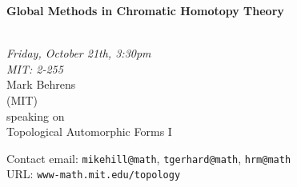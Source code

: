 \documentclass{slides}
\begin{document}
\begin{center}

{\fontsize {54pt}{40pt}\selectfont

\textrm{
{\textbf{Global Methods in Chromatic Homotopy Theory}}}
}\\
\vspace{1cm}
{\large\textrm{\emph{Friday, October 21th, 3:30pm\\MIT: 2-255}}}\\
\vspace{1cm}
\textrm{{\LARGE Mark Behrens  \\[.5cm](MIT)}}\\
\vspace{1cm} %
\textrm{speaking on}\\ %
\vspace{5mm}
\textrm{{\LARGE Topological Automorphic Forms I}}\\
\end{center}
\vspace{1cm}
{\small

\textrm{Contact email: } \texttt{mikehill@math}, \texttt{tgerhard@math},
\texttt{hrm@math}\\
\textrm{URL: } \texttt{www-math.mit.edu/topology}
}
\end{document}
